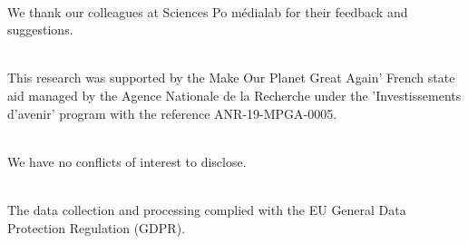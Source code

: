 \documentclass{article}
\begin{document}
 \\
We thank our colleagues at Sciences Po m\'{e}dialab for their feedback and suggestions. \bigskip

 \\
This research was supported by the Make Our Planet Great Again’ French state aid managed by the Agence Nationale de la Recherche under the ’Investissements d’avenir’ program with the reference ANR-19-MPGA-0005. \bigskip

 \\
We have no conflicts of interest to disclose. \bigskip

 \\
The data collection and processing complied with the EU General Data Protection Regulation (GDPR).
\end{document}
